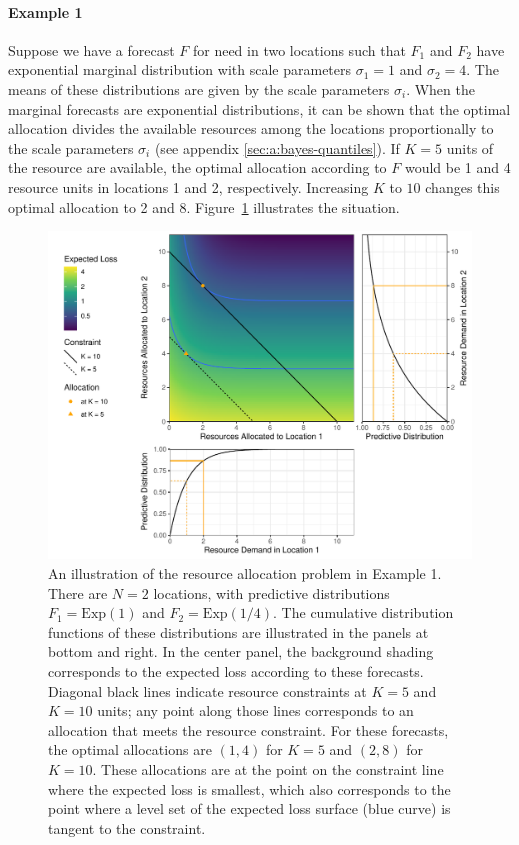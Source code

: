 \documentclass{article}\usepackage[]{graphicx}\usepackage[]{xcolor}
\providecommand{\DIFaddbegin}{} %
\providecommand{\DIFaddend}{} %
\newcommand{\DIFaddincludegraphics}[2][]{{\color{blue}\fbox{\DIFOincludegraphics[#1]{#2}}}} %
\DeclareRobustCommand{\DIFaddbegin}{\DIFOaddbegin \let\includegraphics\DIFaddincludegraphics} %
\DeclareRobustCommand{\DIFaddend}{\DIFOaddend \let\includegraphics\DIFOincludegraphics} %
\begin{document}
\paragraph{Example 1} \DIFaddbegin \label{examp1} \DIFaddend Suppose we have a forecast $F$ for need in two locations such that $F_1$ and $F_2$ have exponential marginal distribution with scale parameters $\sigma_1 = 1$ and $\sigma_2 = 4$. The means of these distributions are
given by the scale parameters $\sigma_i$. When the marginal forecasts are exponential distributions, it can be shown
that the optimal allocation divides the available resources among the locations proportionally to the scale parameters
$\sigma_i$ (see appendix \ref{sec:a:bayes-quantiles}). If $K = 5$ units of the resource are
available, the optimal allocation according to $F$ would be 1 and 4 resource units in locations 1 and 2, respectively. 
Increasing $K$ to $10$ changes this optimal allocation to 2 and 8. Figure~\ref{fig:exp_alloc_example} illustrates the 
situation.

\begin{figure}
    \includegraphics[width=\textwidth]{../figures/exponential_pred_expected_loss.pdf}
    \caption{An illustration of the resource allocation problem in Example 1. There are $N = 2$ locations, with
    predictive distributions $F_1 = \mathrm{Exp}(1)$ and $F_2 = \mathrm{Exp}(1/4)$. The cumulative distribution
    functions of these distributions are illustrated in the panels at bottom and right. In the center panel, the
    background shading corresponds to the expected loss according to these forecasts. Diagonal black lines indicate
    resource constraints at $K=5$ and $K=10$ units; any point along those lines corresponds to an allocation that meets
    the resource constraint. For these forecasts, the optimal allocations are $(1, 4)$ for $K=5$ and $(2, 8)$ for
    $K=10$. These allocations are at the point on the constraint line where the expected loss is smallest, which also
    corresponds to the point where a level set of the expected loss surface (blue curve) is tangent to the constraint.}
    \label{fig:exp_alloc_example}
\end{figure}
\end{document}
